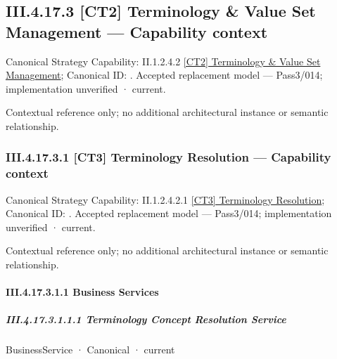 \subsection*{III.4.17.3 [CT2] Terminology \& Value Set Management — Capability context}
\label{navigation:III.4.17.3}

{\small Canonical Strategy Capability: II.1.2.4.2 \hyperref[element:206b3d64a5b14e9a99974851c8be45df]{[CT2] Terminology \& Value Set Management}; Canonical ID: \texttt{}. Accepted replacement model — Pass3/014; implementation unverified · current.}\par
Contextual reference only; no additional architectural instance or semantic relationship.\par
\subsubsection*{III.4.17.3.1 [CT3] Terminology Resolution — Capability context}
\label{navigation:III.4.17.3.1}

{\small Canonical Strategy Capability: II.1.2.4.2.1 \hyperref[element:aaca8daf33a242b19a748be71003fb2c]{[CT3] Terminology Resolution}; Canonical ID: \texttt{}. Accepted replacement model — Pass3/014; implementation unverified · current.}\par
Contextual reference only; no additional architectural instance or semantic relationship.\par
\paragraph*{III.4.17.3.1.1 Business Services}
\label{navigation:III.4.17.3.1.1}

\subparagraph*{III.4.17.3.1.1.1 Terminology Concept Resolution Service}
\label{navigation:III.4.17.3.1.1.1}

\label{element:3be22abcc49045c7a609bdf6428fe15a}
{\small BusinessService · Canonical · current}\par


